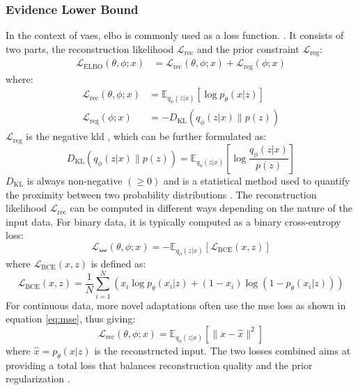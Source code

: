 \subsubsection{Evidence Lower Bound}
In the context of \acrshort{vae}s, \acrshort{elbo} is commonly used as a loss function. \cite{lygerakis2024edvaeentropydecompositionelbo}. It consists of two parts, the reconstruction likelihood $\mathcal{L}_{\text{rec}}$ and the prior constraint $\mathcal{L}_{\text{reg}}$:
\begin{align}
\mathcal{L}_{\text{ELBO}}(\theta, \phi; x) &= \mathcal{L}_{\text{rec}}(\theta, \phi; x) + \mathcal{L}_{\text{reg}}(\phi; x)  
\end{align}
where:
\begin{align}
\mathcal{L}_{\text{rec}}(\theta, \phi; x) &= \mathbb{E}_{q_\phi(z|x)}[\log p_\theta(x|z)] \\
\mathcal{L}_{\text{reg}}(\phi; x) &= -D_{\text{KL}}(q_\phi(z|x) \| p(z))
\end{align}
$\mathcal{L}_{\text{reg}}$ is the negative \acrfull{kld} \cite{10.1214/aoms/1177729694}, which can be further formulated as:
\begin{equation}
    D_{\text{KL}}(q_\phi(z|x) \| p(z)) = \mathbb{E}_{q_\phi(z|x)}\left[\log \frac{q_\phi(z|x)}{p(z)}\right]
\end{equation}
$D_{\text{KL}}$ is always non-negative $(\geq 0)$ and is a statistical method used to quantify the proximity between two probability distributions \cite{shlens2014notes}. 
The reconstruction likelihood $\mathcal{L}_{\text{rec}}$ can be computed in different ways depending on the nature of the input data. For binary data, it is typically computed as a binary cross-entropy loss:
\begin{equation}
\mathcal{L_\text{rec}}(\theta, \phi; x) = - \mathbb{E}_{q_\phi(z|x)}[\mathcal{L}_{\text{BCE}}(x, z)]
\end{equation}
where $\mathcal{L}_{\text{BCE}}(x, z)$ is defined as:
\begin{equation}
\mathcal{L}_{\text{BCE}}(x, z) = \frac{1}{N} \sum_{i=1}^{N} \left( x_i \log p_\theta(x_i|z) + (1 - x_i) \log(1 - p_\theta(x_i|z)) \right)
\end{equation}
For continuous data, more novel adaptations \cite{lygerakis2024edvaeentropydecompositionelbo} often use the \acrshort{mse} loss as shown in equation \ref{eq:mse}, thus giving:
\begin{equation}
    \mathcal{L}_{\text{rec}}(\theta, \phi; x) = \mathbb{E}_{q_\phi(z|x)}[\|x - \hat{x}\|^2]
\end{equation}
where $\hat{x} = p_\theta(x|z)$ is the reconstructed input.
The two losses combined aims at providing a total loss that balances reconstruction quality and the prior regularization \cite{lin2019balancingreconstructionqualityregularisation}.


